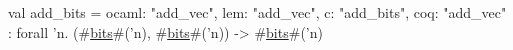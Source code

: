 val add_bits = {
  ocaml: "add_vec",
  lem: "add_vec",
  c: "add_bits",
  coq: "add_vec"
} : forall 'n. (#\hyperref[zbits]{bits}#('n), #\hyperref[zbits]{bits}#('n)) -> #\hyperref[zbits]{bits}#('n)
